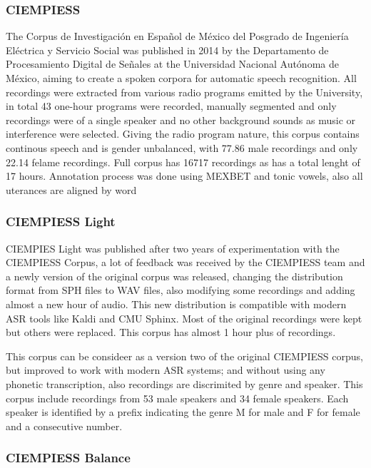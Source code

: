 \documentclass[10pt, a4paper]{article}
\begin{document}
\subsubsection{CIEMPIESS}

The Corpus de Investigación en Español de México del Posgrado de Ingeniería Eléctrica y Servicio Social was published in 2014 by the Departamento de Procesamiento Digital de Señales at the Universidad Nacional Autónoma de México, aiming to create a spoken corpora for automatic speech recognition. All recordings were extracted from various radio programs emitted by the University, in total 43 one-hour programs were recorded, manually segmented and only recordings were of a single speaker and no other background sounds as music or interference were selected. Giving the radio program nature, this corpus contains continous speech and is gender unbalanced, with 77.86 male recordings and only 22.14 felame recordings. Full corpus has 16717 recordings as has a total lenght of 17 hours. Annotation process was done using MEXBET and tonic vowels, also all uterances are aligned by word

\subsubsection{CIEMPIESS Light}

CIEMPIES Light was published after two years of experimentation with the CIEMPIESS Corpus, a lot of feedback was received by the CIEMPIESS team and a newly version of the original corpus was released, changing the distribution format from SPH files to WAV files, also modifying some recordings and adding almost a new hour of audio. This new distribution is compatible with modern ASR tools like Kaldi and CMU Sphinx. Most of the original recordings were kept but others were replaced. This corpus has almost 1 hour plus of recordings.

This corpus can be consideer as a version two of the original CIEMPIESS corpus, but improved to work with modern ASR systems; and without using any phonetic transcription, also recordings are discrimited by genre and speaker. This corpus include recordings from 53 male speakers and 34 female speakers. Each speaker is identified by a prefix indicating the genre M for male and F for female and a consecutive number.

\subsubsection{CIEMPIESS Balance}
\end{document}

